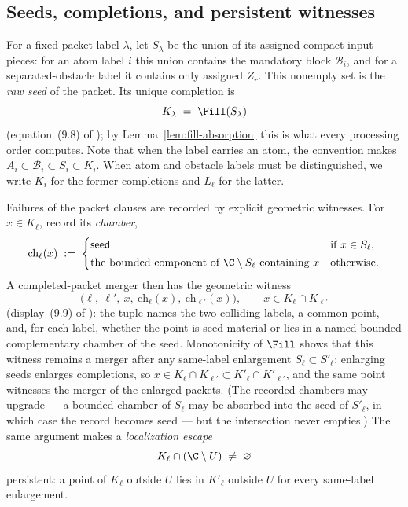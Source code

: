 \subsection{Seeds, completions, and persistent witnesses}\label{subsec:E-witnesses}

For a fixed packet label $\lambda$, let $S_\lambda$ be the union of its
assigned compact input pieces: for an atom label $i$ this union contains
the mandatory block $\mathcal B_i$, and for a separated-obstacle label it contains
only assigned $Z_r$.  This nonempty set is the \emph{raw seed} of the packet. Its unique completion is
\begin{equation}\label{eq:E-completion}
K_\lambda\;=\;\Fill(S_\lambda)
\end{equation}
(equation~(9.8) of \cite{MWman}); by Lemma~\ref{lem:fill-absorption} this is what
every processing order computes. Note that when the label carries an atom, the
convention makes $A_i\subset\mathcal B_i\subset S_i\subset K_i$.  When atom and
obstacle labels must be distinguished, we write $K_i$ for the former
completions and $L_\ell$ for the latter.

Failures of the packet clauses are recorded by explicit geometric witnesses. For
$x\in K_\ell$, record its \emph{chamber},
\[
\mathrm{ch}_\ell(x)\;:=\;
\begin{cases}
\textsf{seed} & \text{if }x\in S_\ell,\\[2pt]
\text{the bounded component of }\C\setminus S_\ell\text{ containing }x
& \text{otherwise.}
\end{cases}
\]
A completed-packet merger then has the geometric witness
\begin{equation}\label{eq:E-witness}
\bigl(\ell,\ \ell',\ x,\ \mathrm{ch}_\ell(x),\ \mathrm{ch}_{\ell'}(x)\bigr),
\qquad x\in K_\ell\cap K_{\ell'}
\end{equation}
(display~(9.9) of \cite{MWman}): the tuple names the two colliding labels, a common
point, and, for each label, whether the point is seed material or lies in a named
bounded complementary chamber of the seed. Monotonicity of $\Fill$ shows that this
witness remains a merger after any same-label enlargement $S_\ell\subset S'_\ell$:
enlarging seeds enlarges completions, so
$x\in K_\ell\cap K_{\ell'}\subset K'_\ell\cap K'_{\ell'}$, and the same point
witnesses the merger of the enlarged packets. (The recorded chambers may upgrade ---
a bounded chamber of $S_\ell$ may be absorbed into the seed of $S'_\ell$, in which
case the record becomes \textsf{seed} --- but the intersection never empties.) The
same argument makes a \emph{localization escape}
\[
K_\ell\cap(\C\setminus U)\;\neq\;\varnothing
\]
persistent: a point of $K_\ell$ outside $U$ lies in $K'_\ell$ outside $U$ for every
same-label enlargement.

